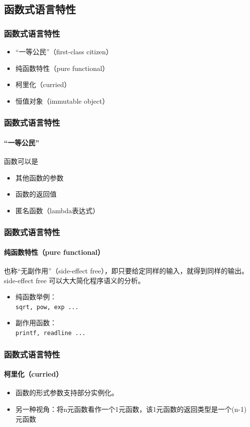 \documentclass{beamer}
\begin{document}
\subsection{函数式语言特性}
\begin{frame}
  \frametitle{函数式语言特性}
  \begin{itemize}
    \item “一等公民”（first-class citizen）
    \item 纯函数特性（pure functional）
    \item 柯里化（curried）
    \item 恒值对象（immutable object）
  \end{itemize}
\end{frame}

\begin{frame}
  \frametitle{函数式语言特性}
  \framesubtitle{“一等公民”}
  函数可以是
  \begin{itemize}
    \item<1-> 其他函数的参数
      
    \item<2-> 函数的返回值\\
      
    \item<3-> 匿名函数（lambda表达式）\\
      
  \end{itemize}
\end{frame}

\begin{frame}
  \frametitle{函数式语言特性}
  \framesubtitle{纯函数特性（pure functional）}
  也称“无副作用”（side-effect free），即只要给定同样的输入，就得到同样的输出。
  side-effect free 可以大大简化程序语义的分析。
  \begin{itemize}
    \item 纯函数举例：\\\texttt{sqrt, pow, exp ...}
    \item 副作用函数：\\\texttt{printf, readline ...}
  \end{itemize}
\end{frame}

\begin{frame}
  \frametitle{函数式语言特性}
  \framesubtitle{柯里化（curried）}
  \begin{itemize}
    \item<1-> 函数的形式参数支持部分实例化。
      
    \item<2-> 另一种视角：将n元函数看作一个1元函数，该1元函数的返回类型是一个(n-1)元函数
      
  \end{itemize}
\end{frame}
\end{document}
